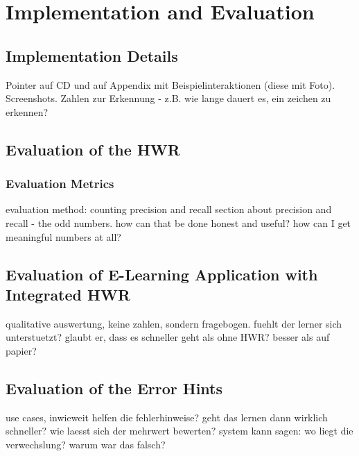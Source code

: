 \chapter{Implementation and Evaluation}
\section{Implementation Details}
Pointer auf CD und auf Appendix mit Beispielinteraktionen (diese mit Foto).
Screenshots.
Zahlen zur Erkennung - z.B. wie lange dauert es, ein zeichen zu erkennen?

\section{Evaluation of the HWR}
\subsection{ Evaluation Metrics }
evaluation method: counting precision and recall
section about precision and recall - the odd numbers.
how can that be done honest and useful?
how can I get meaningful numbers at all?

\section{Evaluation of E-Learning Application with Integrated HWR}
qualitative auswertung, keine zahlen, sondern fragebogen.
fuehlt der lerner sich unterstuetzt? glaubt er, dass es schneller geht als ohne 
HWR? 
besser als auf papier?

\section{Evaluation of the Error Hints}
use cases, inwieweit helfen die fehlerhinweise?
geht das lernen dann wirklich schneller?
wie laesst sich der mehrwert bewerten?
system kann sagen: wo liegt die verwechslung? warum war das falsch?


